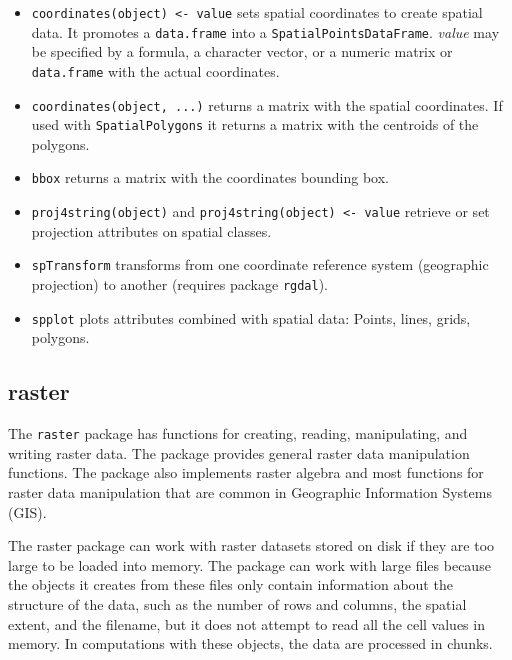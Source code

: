 \documentclass[smallroyalvopaper]{memoir}
\begin{document}
\begin{itemize}
\item \texttt{coordinates(object) <- value} sets spatial coordinates to create spatial data. It promotes a \texttt{data.frame} into a \texttt{SpatialPointsDataFrame}. \emph{value} may be specified by a formula, a character vector, or a numeric matrix or \texttt{data.frame} with the actual coordinates.

\item \texttt{coordinates(object, ...)} returns a matrix with the spatial coordinates. If used with \texttt{SpatialPolygons} it returns a matrix with the centroids of the polygons.

\item \texttt{bbox} returns a matrix with the coordinates bounding box.

\item \texttt{proj4string(object)} and \texttt{proj4string(object) <- value} retrieve or set projection attributes on spatial classes.

\item \texttt{spTransform} transforms from one coordinate reference system (geographic projection) to another (requires package \texttt{rgdal}).

\item \texttt{spplot} plots attributes combined with spatial data: Points, lines, grids, polygons.
\end{itemize}

\subsection{raster}
\label{sec:orgheadline25}
\label{sec:raster}


The \texttt{raster} package \cite{Hijmans2013} has functions for creating, reading, manipulating, and writing raster data. The package provides general raster data manipulation functions. The package also implements raster algebra and most functions for raster data manipulation that are common in Geographic Information Systems (GIS).

The raster package can work with raster datasets stored on disk if they are too large to be loaded into memory. The package can work with large files because the objects it creates from these files only contain information about the structure of the data, such as the number of rows and columns, the spatial extent, and the filename, but it does not attempt to read all the cell values in memory. In computations with these objects, the data are processed in chunks.
\end{document}

